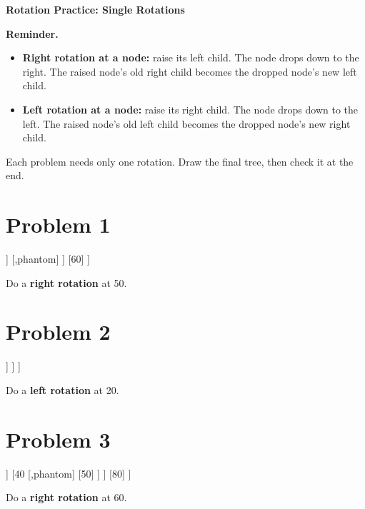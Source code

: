 \documentclass[11pt]{article}
\begin{document}
	
	\begin{center}
		{\Large \textbf{Rotation Practice: Single Rotations}}
	\end{center}
	
	\textbf{Reminder.}
	\begin{itemize}
		\item \textbf{Right rotation at a node:} raise its left child. The node drops down to the right. The raised node's old right child becomes the dropped node's new left child.
		\item \textbf{Left rotation at a node:} raise its right child. The node drops down to the left. The raised node's old left child becomes the dropped node's new right child.
	\end{itemize}
	Each problem needs only one rotation. Draw the final tree, then check it at the end.
	
	\section*{Problem 1}
	\begin{center}
		\begin{forest}
			[50
			[30
			[20
			[10]
			[,phantom]
			]
			[,phantom]
			]
			[60]
			]
		\end{forest}
	\end{center}
	Do a \textbf{right rotation} at 50.
	
	\section*{Problem 2}
	\begin{center}
		\begin{forest}
			[20
			[10]
			[40
			[,phantom]
			[50
			[,phantom]
			[60]
			]
			]
			]
		\end{forest}
	\end{center}
	Do a \textbf{left rotation} at 20.
	
	\section*{Problem 3}
	\begin{center}
		\begin{forest}
			[60
			[30
			[20
			[10]
			[,phantom]
			]
			[40
			[,phantom]
			[50]
			]
			]
			[80]
			]
		\end{forest}
	\end{center}
	Do a \textbf{right rotation} at 60.
	
\end{document}
